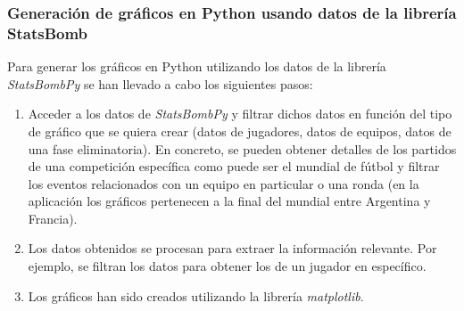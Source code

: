 \subsubsection{Generación de gráficos en Python usando datos de la librería StatsBomb}
Para generar los gráficos en Python utilizando los datos de la librería \textit{StatsBombPy} se han llevado a cabo los siguientes pasos:
\begin{enumerate}
    \item Acceder a los datos de \textit{StatsBombPy} y filtrar dichos datos en función del tipo de gráfico que se quiera crear (datos de jugadores, datos de equipos, datos de una fase eliminatoria). En concreto, se pueden obtener detalles de los partidos de una competición específica como puede ser el mundial de fútbol y filtrar los eventos relacionados con un equipo en particular o una ronda (en la aplicación los gráficos pertenecen a la final del mundial entre Argentina y Francia).
    \item Los datos obtenidos se procesan para extraer la información relevante. Por ejemplo, se filtran los datos para obtener los de un jugador en específico.
    \item Los gráficos han sido creados utilizando la librería \textit{matplotlib}.
\end{enumerate}

